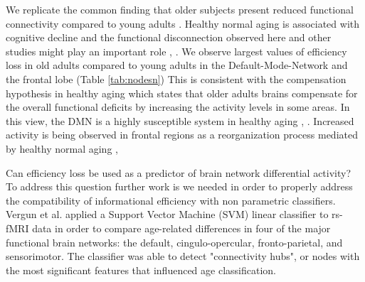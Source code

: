 \documentclass[12pt,a4paper]{article}
\begin{document}
We replicate the common finding that older subjects present reduced functional connectivity compared to young adults \cite{sala-llonch_changes_2014}. Healthy normal aging is associated with cognitive decline and the functional disconnection observed here and other studies might play an important role \cite{ferreira_resting-state_2013}, \cite{dennis_functional_2014}.  
We observe largest values of efficiency loss in old adults compared to young adults in the Default-Mode-Network and the frontal lobe (Table \ref{tab:nodesn})
This is consistent with the compensation hypothesis in healthy aging which states that older adults brains compensate for the overall functional deficits by increasing the activity levels in some areas. In this view, the DMN is a highly susceptible system in healthy aging \cite{betzel_changes_2014}, \cite{onoda_decreased_2012}.  Increased activity is being observed in frontal regions as a reorganization process mediated by healthy normal aging \cite{cabeza_aging_2002}, \cite{park_adaptive_2009}   

Can efficiency loss be used as a predictor of brain network differential activity? 
To address this question further work is we needed in order to properly address the compatibility of informational efficiency with non parametric classifiers. 
Vergun et al. \cite{vergun_characterizing_2013} applied a Support Vector Machine (SVM) linear classifier to rs-fMRI data in order to compare age-related differences in four of the major functional brain networks: the default, cingulo-opercular, fronto-parietal, and sensorimotor. 
The classifier was able to detect "connectivity hubs", or nodes with the most significant features that influenced age classification. 
\end{document}
